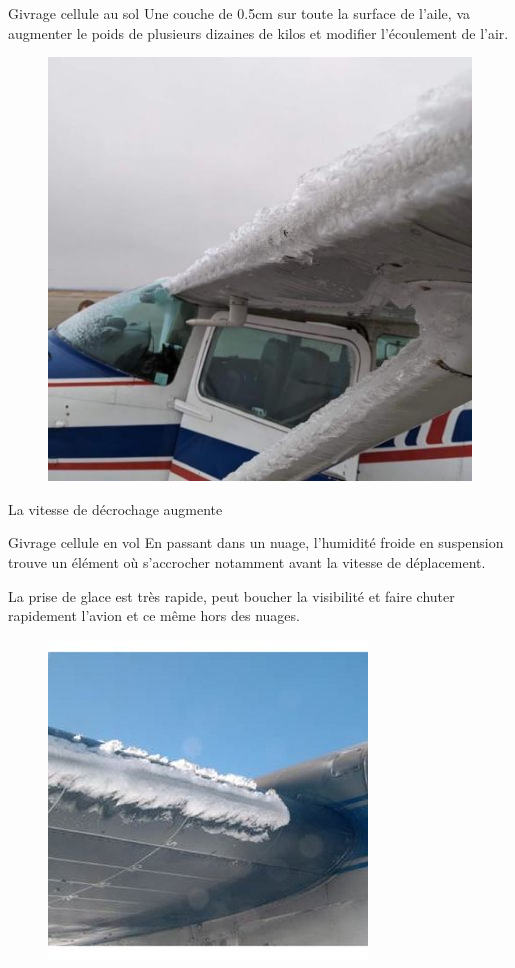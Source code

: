 \documentclass{beamer}
\begin{document}
\begin{frame}{Givrage cellule au sol}
  Une couche de 0.5cm sur toute la surface de l'aile, va augmenter le poids de plusieurs dizaines de kilos et modifier l'écoulement de l'air.
  \pause
  \begin{figure}
    \centering
    \includegraphics[scale=0.5]{images/GIVRAGE.jpg}
  \end{figure}
  
  La vitesse de décrochage augmente
\end{frame}

\begin{frame}{Givrage cellule en vol}
  En passant dans un nuage, l'humidité froide en suspension trouve un
  élément où s'accrocher notamment avant la vitesse de déplacement.
  \pause
  
  La prise de glace est très rapide, peut boucher la visibilité et
  faire chuter rapidement l'avion et ce même hors des nuages.
  \pause
  \begin{figure}
    \centering
    \includegraphics[scale=0.5]{images/accretion.jpg}
  \end{figure}
  
\end{frame}
\end{document}
